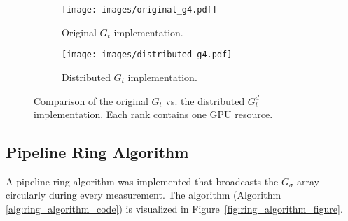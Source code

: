 



\begin{figure}
\centering
     \begin{subfigure}[b]{\columnwidth}
         \centering
         \texttt{[image: images/original\_g4.pdf]}
         \caption{Original $G_t$ implementation.}
         \label{fig:original_g4}
     \end{subfigure}
     
    \begin{subfigure}[b]{\columnwidth}
         \centering
         \texttt{[image: images/distributed\_g4.pdf]}
         \caption{Distributed $G_t$ implementation.}
         \label{fig:distributed_g4}
     \end{subfigure}
     
\caption{Comparison of the original $G_t$ vs. the distributed $G^d_t$ implementation. Each rank contains one GPU resource.}
\label{fig:compare_original_distributed_g4}
\end{figure}

\subsection{Pipeline Ring Algorithm}
\label{section:ring_algorithm}
A pipeline ring algorithm was implemented that broadcasts the $G_{\sigma}$ 
array circularly during every measurement. 
%
The algorithm (Algorithm \ref{alg:ring_algorithm_code}) is 
visualized in Figure~\ref{fig:ring_algorithm_figure}.

